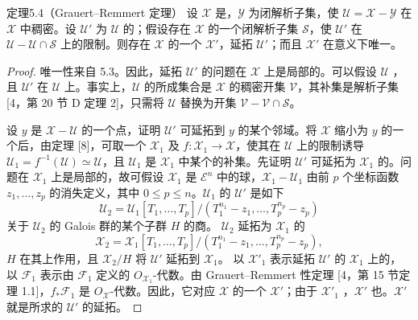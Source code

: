 \begin{SGAresult}{定理}{5.4（Grauert–Remmert 定理）}
设 $\mathcal X$ 是，$\mathcal Y$ 为闭解析子集，使 $\mathcal U=\mathcal X-\mathcal Y$ 在 $\mathcal X$ 中稠密。设 $\mathcal U'$ 为 $\mathcal U$ 的；假设存在 $\mathcal X$ 的一个闭解析子集 $\mathcal S$，使 $\mathcal U'$ 在 $\mathcal U-\mathcal U\cap\mathcal S$ 上的限制。则存在 $\mathcal X$ 的一个 $\mathcal X'$，延拓 $\mathcal U'$；而且 $\mathcal X'$ 在意义下唯一。
\end{SGAresult}
\begin{proof}
唯一性来自 5.3。因此，延拓 $\mathcal U'$ 的问题在 $\mathcal X$ 上是局部的。可以假设 $\mathcal U$ ，且 $\mathcal U'$ 在 $\mathcal U$ 上。事实上，$\mathcal U$ 的所成集合是 $\mathcal X$ 的稠密开集 $\mathcal V$，其补集是解析子集 [4，第 20 节 D 定理 2]，只需将 $\mathcal U$ 替换为开集 $\mathcal V-\mathcal V\cap\mathcal S$。

设 $y$ 是 $\mathcal X-\mathcal U$ 的一个点，证明 $\mathcal U'$ 可延拓到 $y$ 的某个邻域。将 $\mathcal X$ 缩小为 $y$ 的一个后，由定理 [8]，可取一个 $\mathcal X_1$ 及 $f:\mathcal X_1\to\mathcal X$，使其在 $\mathcal U$ 上的限制诱导 $\mathcal U_1=f^{-1}(\mathcal U)\simeq\mathcal U$，且 $\mathcal U_1$ 是 $\mathcal X_1$ 中某个的补集。先证明 $\mathcal U'$ 可延拓为 $\mathcal X_1$ 的。问题在 $\mathcal X_1$ 上是局部的，故可假设 $\mathcal X_1$ 是 $\mathcal E^n$ 中的球，$\mathcal X_1-\mathcal U_1$ 由前 $p$ 个坐标函数 $z_1,\ldots,z_p$ 的消失定义，其中 $0\leq p\leq n$。$\mathcal U_1$ 的 $\mathcal U'$ 是如下
\[
\mathcal U_2=\mathcal U_1[T_1,\ldots,T_p]/(T_1^{n_1}-z_1,\ldots,T_p^{n_p}-z_p)
\]
关于 $\mathcal U_2$ 的 Galois 群的某个子群 $H$ 的商。 $\mathcal U_2$ 延拓为 $\mathcal X_1$ 的
\[
\mathcal X_2=\mathcal X_1[T_1,\ldots,T_p]/(T_1^{n_1}-z_1,\ldots,T_p^{n_p}-z_p),
\]
$H$ 在其上作用，且 $\mathcal X_2/H$ 将 $\mathcal U'$ 延拓到 $\mathcal X_1$。
以 $\mathcal X'_1$ 表示延拓 $\mathcal U'$ 的 $\mathcal X_1$ 上的，以 $\mathcal F_1$ 表示由 $\mathcal F_1$ 定义的 $O_{\mathcal X_1}$-代数。由 Grauert–Remmert 性定理 [4，第 15 节定理 1.1]，$f_*\mathcal F_1$ 是 $O_{\mathcal X}$-代数。因此，它对应 $\mathcal X$ 的一个 $\mathcal X'$；由于 $\mathcal X'_1$ ，$\mathcal X'$ 也。$\mathcal X'$ 就是所求的 $\mathcal U'$ 的延拓。
\end{proof}

